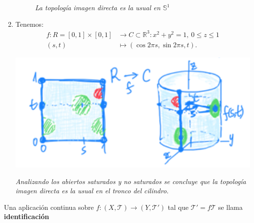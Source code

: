 \begin{ej}
\begin{enumerate}
\begin{figure}[H]
        \caption{\textit{La topología imagen directa es la usual en $\mathbb{S}^1$}}
        \label{fig:proyeccion_exponencial_img_directa}
    \end{figure}

    \item Tenemos:
    \begin{align*}
        f: R = \left[ 0, 1 \right] \times \left[ 0, 1 \right] &\rightarrow C \subset \mathbb{R}^3: x^2 + y^2 = 1,\ 0 \le z \le 1\\
        \left( s, t \right) &\mapsto \left( \cos 2\pi s, \sin 2\pi s, t \right) 
    .\end{align*}

    \begin{center}
        \includegraphics[scale=0.3]{images/ej_top_dir_2}

        \textit{Analizando los abiertos saturados y no saturados se concluye que la topología imagen directa es la usual en el tronco del cilindro.} 
    \end{center}
\end{enumerate}
\end{ej}

\begin{defi}
Una aplicación continua sobre $f: \left( X, \mathcal{T} \right) \rightarrow \left( Y, \mathcal{T}' \right)$ tal que $\mathcal{T}' = f\mathcal{T}$ se llama \textbf{identificación} 
\end{defi}


